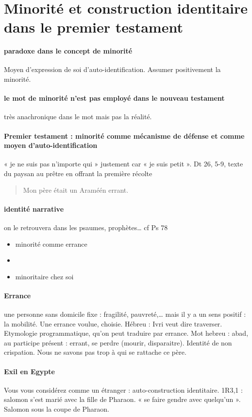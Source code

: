 \section{Minorité et construction identitaire dans le premier testament }
\paragraph{paradoxe dans le concept de minorité} Moyen d’expression de soi d’auto-identification. Assumer positivement la minorité. 

\paragraph{le mot de minorité n’est pas employé dans le nouveau testament} très anachronique dans le mot mais pas la réalité.
\paragraph{Premier testament : minorité comme mécanisme de défense et comme moyen d’auto-identification} « je ne suis pas n’importe qui » justement car « je suis petit ». 
Dt 26, 5-9, texte du paysan au prêtre en offrant la première récolte
\begin{quote}
Mon père était un Araméén errant.
\end{quote}
\paragraph{identité narrative} on le retrouvera dans les psaumes, prophètes… cf Ps 78
\begin{itemize}
\item minorité comme errance
\item 
\item minoritaire chez soi
\end{itemize}
\paragraph{Errance} une personne sans domicile fixe : fragilité, pauvreté,… mais il y a un sens positif : la mobilité. Une errance voulue, choisie. Hébreu : Ivri veut dire traverser. Etymologie programmatique, qu’on peut traduire par errance. Mot hebreu : abad, au participe présent : errant, se perdre (mourir, disparaitre). Identité de non crispation. Nous ne savons pas trop à qui se rattache ce père. 
\paragraph{Exil en Egypte} Vous vous considérez comme un étranger : auto-construction identitaire. 1R3,1 : salomon s’est marié avec la fille de Pharaon. « se faire gendre avec quelqu’un ». Salomon sous la coupe de Pharaon. 

